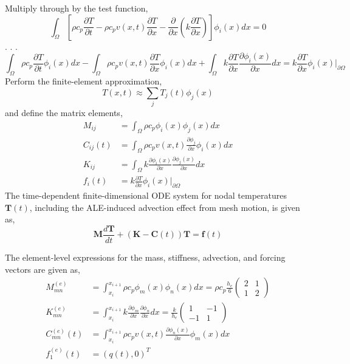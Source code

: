 Multiply through by the test function,
\begin{equation}
    \int_{\Omega}\left[\rho c_p\frac{\partial T}{\partial t} - \rho c_p v(x,t)\frac{\partial T}{\partial x} - \frac{\partial}{\partial x}\left(k\frac{\partial T}{\partial x}\right)\right]\phi_i(x)dx = 0
\end{equation}
.
.
.
\begin{equation}
    \int_{\Omega}\rho c_p\frac{\partial T}{\partial t}\phi_i(x)dx - \int_{\Omega}\rho c_p v(x,t)\frac{\partial T}{\partial x}\phi_i(x)dx + \int_{\Omega} k\frac{\partial T}{\partial x}\frac{\partial\phi_i(x)}{\partial x} dx = k\frac{\partial T}{\partial x}\phi_i(x)\Bigg|_{\partial\Omega}
\end{equation}
Perform the finite-element approximation,
\begin{equation}
    T(x,t)\approx\sum_jT_j(t)\phi_j(x)
\end{equation}
and define the matrix elements,
\begin{align}
    M_{ij} &= \int_{\Omega}\rho c_p\phi_i(x)\phi_j(x)dx\\
    C_{ij}(t) &= \int_{\Omega}\rho c_p v(x,t) \frac{\partial\phi_j}{\partial x}\phi_i(x)dx\\
    K_{ij} &= \int_{\Omega}k\frac{\partial\phi_i(x)}{\partial x}\frac{\partial\phi_j(x)}{\partial x}dx\\
    f_i(t) &= k\frac{\partial T}{\partial x}\phi_i(x)\Bigg|_{\partial\Omega}
\end{align}
The time-dependent finite-dimensional ODE system for nodal temperatures $\mathbf{T}(t)$, including the ALE-induced advection effect from mesh motion, is given as,
\begin{equation}
    \mathbf{M}\frac{d\mathbf{T}}{dt} + \left(\mathbf{K} - \mathbf{C}(t)\right)\mathbf{T} = \mathbf{f}(t)
\end{equation}

The element-level expressions for the mass, stiffness, advection, and forcing vectors are given as,
\begin{align}
    M^{(e)}_{mn} &= \int_{x_i}^{x_{i+1}}\rho c_p\phi_m(x)\phi_n(x)dx = \rho c_p \frac{h_e}{6}\begin{pmatrix}
        2 & 1 \\ 1 & 2
    \end{pmatrix}\\
    K^{(e)}_{mn} &= \int_{x_i}^{x_{i+1}} k \frac{\partial \phi_m}{\partial x}\frac{\partial \phi_n}{\partial x} dx = \frac{k}{h_e}\begin{pmatrix}
        1 & -1 \\ -1 & 1
    \end{pmatrix}\\
    C^{(e)}_{mn}(t) &= \int_{x_i}^{x_{i+1}}\rho c_p v(x,t) \frac{\partial \phi_n(x)}{\partial x}\phi_m(x) dx\\
    f^{(e)}_1(t) &= \left(q(t),0\right)^T
\end{align}

